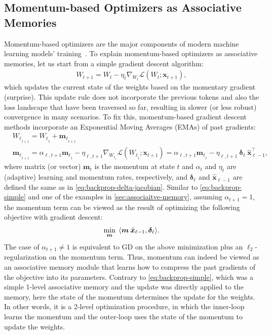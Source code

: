 \subsection{Momentum-based Optimizers as Associative Memories}\label{sec:momentum-based}
Momentum-based optimizers are the major components of modern machine learning models' training~\citep{kingma2014adam, jordanmuon, duchi2011adaptive}. To explain momentum-based optimizers as associative memories, let us start from a simple gradient descent algorithm:
\begin{align}
    W_{t+1} = W_{t} - \eta_t \nabla_{W_{t}} \mathcal{L} (W_t; \boldsymbol{x}_{t+1}),
\end{align}
which updates the current state of the weights based on the momentary gradient (surprise). This update rule does not incorporate the previous tokens and also the loss landscape that have been traversed so far, resulting in slower (or less robust) convergence in many scenarios. To fix this, momentum-based gradient descent methods incorporate an Exponential Moving Averages (EMAs) of past gradients:
\begin{align}\nonumber
    &{W_{\ell}}_{_{t+1}} = {W_{\ell}}_{_{t}} + {\boldsymbol{m}_{\ell}}_{_{t+1}}\\ \label{eq:momentum1}
    &{\boldsymbol{m}_{\ell}}_{_{t+1}} = \alpha_{\ell, t+1} {\boldsymbol{m}_{\ell}}_{_{t}} - \eta_{\ell, t+1} \nabla_{{W_{\ell}}_{_{t}}} \mathcal{L}\left({W_{\ell}}_{_{t}}; \boldsymbol{x}_{t+1}\right) = \alpha_{\ell, t+1} {\boldsymbol{m}_{\ell}}_{_{t}} - \eta_{\ell, t+1} \: \boldsymbol{\delta}_{\ell} \: \hat{\boldsymbol{x}}_{\ell - 1}^{\top}, 
\end{align}
where matrix (or vector) $\boldsymbol{m}_t$ is the momentum at state $t$ and $\alpha_t$ and $\eta_t$ are (adaptive) learning and momentum rates, respectively, and $\boldsymbol{\delta}_{\ell}$ and $\hat{\boldsymbol{x}}_{\ell - 1}$ are defined the same as in \autoref{eq:backprop-delta-jacobian}. Similar to \autoref{eq:backprop-simple} and one of the examples in \autoref{sec:associaitve-memory}, {assuming $\alpha_{t+1} =1$}, the momentum term can be viewed as the result of optimizing the following objective with gradient descent:
\begin{align}\label{eq:momentum-map1}
    \min_{\boldsymbol{m}}\:\: \langle \boldsymbol{m} \: \hat{\boldsymbol{x}}_{\ell - 1}, \boldsymbol{\delta}_{\ell} \rangle. 
\end{align}
The case of $\alpha_{t+1} \neq 1$ is equivalent to GD on the above minimization plus an $\ell_2$-regularization on the momentum term. Thus, momentum can indeed be viewed as an associative memory module that learns how to compress the past gradients of the objective into its parameters. Contrary to \autoref{eq:backprop-simple}, which was a simple 1-level associative memory and the update was directly applied to the memory, here the state of the momentum determines the update for the weights. In other words, it is a 2-level optimization procedure, in which the inner-loop learns the momentum and the outer-loop uses the state of the momentum to update the weights. 



